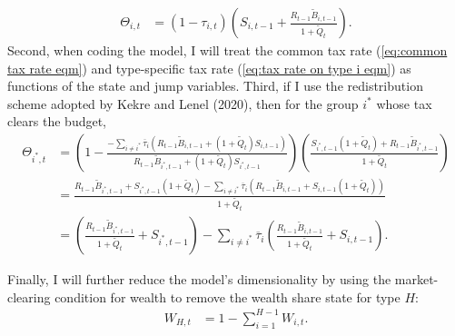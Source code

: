 \documentclass[12 pt, oneside]{article}
\theoremstyle{definition}
\theoremstyle{definition}
\theoremstyle{definition}
\begin{document}
\begin{align*}
  \Theta_{i, t} & = (1 - \tau_{i, t})\left(S_{i, t - 1} + \frac{R_{t - 1}\tilde{B}_{i, t - 1}}{1 + \tilde{Q}_t}\right).
\end{align*}
Second, when coding the model, I will treat the common tax rate (\ref{eq:common tax rate eqm}) and type-specific tax rate (\ref{eq:tax rate on type i eqm}) as functions of the state and jump variables. Third, if I use the redistribution scheme adopted by Kekre and Lenel (2020), then
for the group $i^*$ whose tax clears the budget,
\begin{align*}
  \Theta_{i^*, t} & = \left(1 - \frac{-\sum_{i \neq i^*} \overline{\tau}_i (R_{t - 1}\tilde{B}_{i, t - 1} + (1 + \tilde{Q}_t) S_{i, t - 1})}{R_{t - 1}\tilde{B}_{i^*, t - 1} + (1 + \tilde{Q}_t)S_{i^*, t - 1}}\right)\left(\frac{S_{i^*, t - 1}(1 + \tilde{Q}_t) + R_{t - 1}\tilde{B}_{i^*, t - 1}}{1 + \tilde{Q}_t}\right)\\
                  & = \frac{R_{t - 1}\tilde{B}_{i^*, t - 1} + S_{i^*, t - 1}(1 + \tilde{Q}_t) - \sum_{i\neq i^*}\overline{\tau}_i(R_{t - 1}\tilde{B}_{i, t - 1} + S_{i, t - 1}(1 + \tilde{Q}_t))}{1 + \tilde{Q}_t}\\
                  & = \left(\frac{R_{t - 1}\tilde{B}_{i^*, t - 1}}{1 + \tilde{Q}_t} + S_{i^*, t - 1}\right) - \sum_{i\neq i^*}\overline{\tau}_i\left(\frac{R_{t - 1}\tilde{B}_{i, t - 1}}{1 + \tilde{Q}_t} + S_{i, t - 1}\right).
\end{align*}

Finally, I will further reduce the model's dimensionality by using the market-clearing condition for wealth to remove the wealth share state for type $H$:
\begin{align}
  W_{H, t} & = 1 - \sum_{i = 1}^{H - 1} W_{i, t}.
\end{align}
\end{document}
